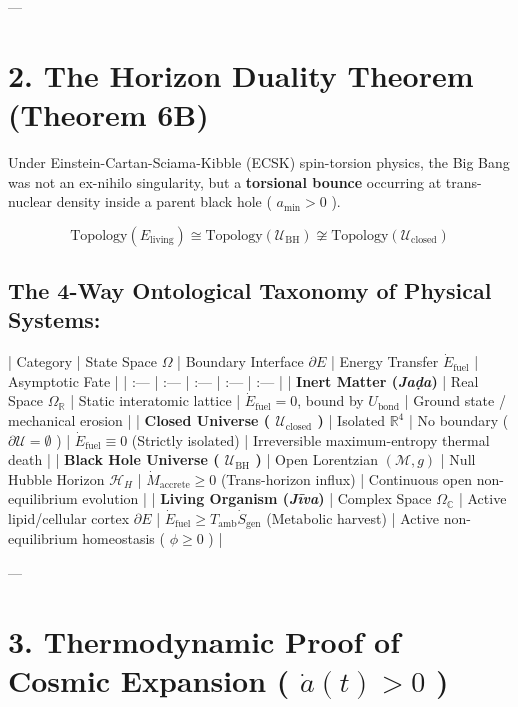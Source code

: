 \documentclass[11pt,a4paper]{article}
\theoremstyle{definition}
\theoremstyle{remark}
\begin{document}
---

\section{2. The Horizon Duality Theorem (Theorem 6B)}

Under Einstein-Cartan-Sciama-Kibble (ECSK) spin-torsion physics, the Big Bang was not an ex-nihilo singularity, but a \textbf{torsional bounce} occurring at trans-nuclear density inside a parent black hole ( $a_{\text{min}} > 0$ ).


\begin{equation}
\boxed{\text{Topology}(E_{\text{living}}) \cong \text{Topology}(\mathcal{U}_{\text{BH}}) \not\cong \text{Topology}(\mathcal{U}_{\text{closed}})}
\end{equation}


\subsection{The 4-Way Ontological Taxonomy of Physical Systems:}

| Category | State Space $\Omega$ | Boundary Interface $\partial E$ | Energy Transfer $\dot{E}_{\text{fuel}}$ | Asymptotic Fate |
| :--- | :--- | :--- | :--- | :--- |
| \textbf{Inert Matter (\textit{Jaḍa})} | Real Space $\Omega_{\mathbb{R}}$ | Static interatomic lattice | $\dot{E}_{\text{fuel}} = 0$, bound by $U_{\text{bond}}$ | Ground state / mechanical erosion |
| \textbf{Closed Universe ( $\mathcal{U}_{\text{closed}}$ )} | Isolated $\mathbb{R}^4$ | No boundary ( $\partial \mathcal{U} = \emptyset$ ) | $\dot{E}_{\text{fuel}} \equiv 0$ (Strictly isolated) | Irreversible maximum-entropy thermal death |
| \textbf{Black Hole Universe ( $\mathcal{U}_{\text{BH}}$ )} | Open Lorentzian $(\mathcal{M}, g)$ | Null Hubble Horizon $\mathcal{H}_H$ | $\dot{M}_{\text{accrete}} \ge 0$ (Trans-horizon influx) | Continuous open non-equilibrium evolution |
| \textbf{Living Organism (\textit{Jīva})} | Complex Space $\Omega_{\mathbb{C}}$ | Active lipid/cellular cortex $\partial E$ | $\dot{E}_{\text{fuel}} \ge T_{\text{amb}}\dot{S}_{\text{gen}}$ (Metabolic harvest) | Active non-equilibrium homeostasis ( $\phi \ge 0$ ) |

---

\section{3. Thermodynamic Proof of Cosmic Expansion ( $\dot{a}(t) > 0$ )}
\end{document}
